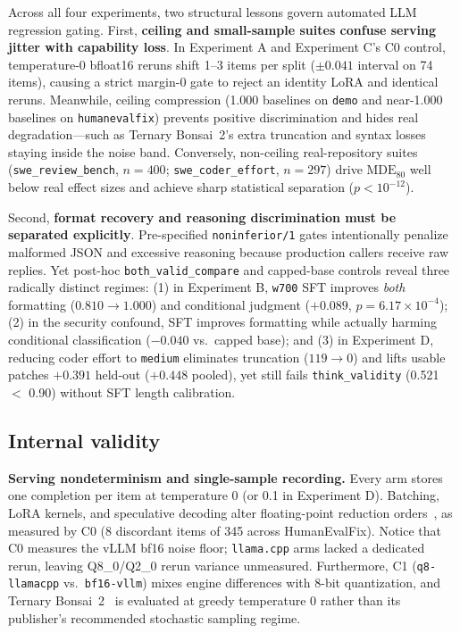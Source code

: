 \documentclass[conference]{IEEEtran}
\begin{document}
Across all four experiments, two structural lessons govern automated LLM regression gating. First, \textbf{ceiling and small-sample suites confuse serving jitter with capability loss}. In Experiment A and Experiment C's C0 control, temperature-0 bfloat16 reruns shift 1--3 items per split ($\pm 0.041$ interval on 74 items), causing a strict margin-0 gate to reject an identity LoRA and identical reruns. Meanwhile, ceiling compression (1.000 baselines on \texttt{demo} and near-1.000 baselines on \texttt{humanevalfix}) prevents positive discrimination and hides real degradation---such as Ternary Bonsai~2's extra truncation and syntax losses staying inside the noise band. Conversely, non-ceiling real-repository suites (\texttt{swe\_\allowbreak{}review\_\allowbreak{}bench}, $n=400$; \texttt{swe\_\allowbreak{}coder\_\allowbreak{}effort}, $n=297$) drive $\mathrm{MDE}_{80}$ well below real effect sizes and achieve sharp statistical separation ($p < 10^{-12}$).

Second, \textbf{format recovery and reasoning discrimination must be separated explicitly}. Pre-specified \texttt{noninferior/\allowbreak{}1} gates intentionally penalize malformed JSON and excessive reasoning because production callers receive raw replies. Yet post-hoc \texttt{both\_\allowbreak{}valid\_\allowbreak{}compare} and capped-base controls reveal three radically distinct regimes: (1) in Experiment B, \texttt{w700} SFT improves \emph{both} formatting ($0.810 \to 1.000$) and conditional judgment ($+0.089$, $p=6.17\times 10^{-4}$); (2) in the security confound, SFT improves formatting while actually harming conditional classification ($-0.040$ vs.\ capped base); and (3) in Experiment D, reducing coder effort to \texttt{medium} eliminates truncation ($119 \to 0$) and lifts usable patches $+0.391$ held-out ($+0.448$ pooled), yet still fails \texttt{think\_\allowbreak{}validity} (0.521 $<$ 0.90) without SFT length calibration.

\subsection{Internal validity}
\label{sec:discussion-internal}

\textbf{Serving nondeterminism and single-sample recording.} Every arm stores one completion per item at temperature 0 (or 0.1 in Experiment D). Batching, LoRA kernels, and speculative decoding alter floating-point reduction orders~\cite{yuan2025nondeterminism,he2025nondeterminism}, as measured by C0 (8 discordant items of 345 across HumanEvalFix). Notice that C0 measures the vLLM bf16 noise floor; \texttt{llama.\allowbreak{}cpp} arms lacked a dedicated rerun, leaving Q8\_0/Q2\_0 rerun variance unmeasured. Furthermore, C1 (\texttt{q8-{}llamacpp} vs.\ \texttt{bf16-{}vllm}) mixes engine differences with 8-bit quantization, and Ternary Bonsai~2~\cite{bonsai2} is evaluated at greedy temperature 0 rather than its publisher's recommended stochastic sampling regime.
\end{document}
